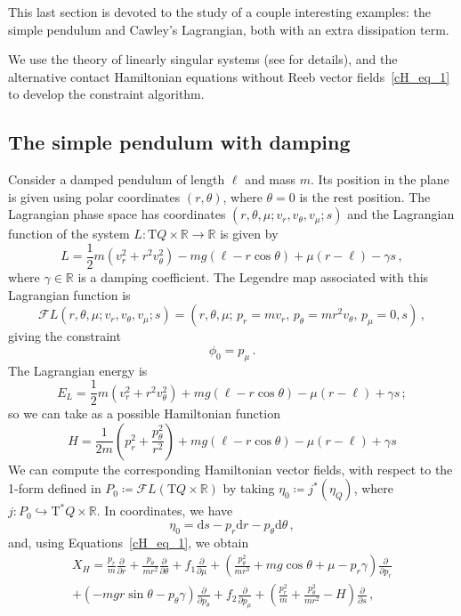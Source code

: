 \documentclass[11pt]{article}
\theoremstyle{plain}
\theoremstyle{definition}
\newcommand{\R}{\mathbb{R}}
\renewcommand{\d}{\mathrm{d}}
\newcommand{\T}{{\mathrm T}}
\let\Tan\T
\newcommand{\F}{\mathcal{F}}
\newcommand{\parder}[2]{\frac{\partial #1}{\partial #2}}
\def\d{\mathrm{d}}
\def\d{\mathrm{d}}
\def\Tan{\mathrm{T}}
\def\FL{\mathcal{F} L}
\begin{document}
This last section is devoted to the study of a couple interesting examples: the simple pendulum and Cawley's Lagrangian, both with an extra dissipation term.

We use the theory of linearly singular systems (see \cite{GP_92} for details), and the alternative contact Hamiltonian equations without Reeb vector fields~\eqref{cH_eq_1} to develop the constraint algorithm.

\subsection{The simple pendulum with damping}

Consider a damped pendulum of length $\ell$ and mass $m$. Its position in the plane is given using polar coordinates $(r,\theta)$, where $\theta = 0$ is the rest position. The Lagrangian phase space has coordinates $(r,\theta,\mu; v_r,v_\theta,v_\mu;s)$ and the Lagrangian function of the system $L\colon\T Q\times\R\to\R$ is given by
$$ L = \frac{1}{2}m(v_r^2 + r^2v_\theta^2) - mg(\ell - r\cos\theta) + \mu(r - \ell) - \gamma s\,, $$
where $\gamma\in\R$ is a damping coefficient. 
The Legendre map associated with this Lagrangian function is
$$ \F L(r,\theta,\mu; v_r,v_\theta,v_\mu;s) = \left( r,\theta,\mu;\, p_r = mv_r,\, p_\theta = mr^2v_\theta,\, p_\mu = 0, s \right)\,, $$
giving the constraint
$$ \phi_0 = p_\mu\,. $$
The Lagrangian energy is
\begin{equation}
    E_L=\frac{1}{2}m(v_r^2 + r^2v_\theta^2) + mg(\ell - r\cos\theta) - \mu(r - \ell) + \gamma s \, ;
\end{equation}
so we can take as a possible Hamiltonian function
\begin{equation}
    H= \frac{1}{2m}\left(p_r^2 + \frac{p_\theta^2}{r^2}\right) + mg(\ell - r\cos\theta) - \mu(r - \ell) + \gamma s
\end{equation}
We can compute the corresponding Hamiltonian vector fields, with respect to the 1-form defined in $P_0\coloneq\FL(\Tan Q \times \R)$ by taking $\eta_0 \coloneqq j^*(\eta_Q)$, where $j\colon P_0\hookrightarrow \Tan^*Q \times \R$. In coordinates, we have
$$
\eta_0 = \d s - p_r \d r -p_{\theta}\d \theta\,,
$$
and, using Equations~\eqref{cH_eq_1}, we obtain
\begin{multline}
    X_H = \frac{p_r}{m}\parder{}{r}+\frac{p_{\theta}}{mr^2}\parder{}{\theta}+f_1\parder{}{\mu} +\left(\frac{p_{\theta}^2}{mr^3}+mg\cos\theta + \mu -p_r\gamma\right)\parder{}{p_r}  \\+(-mgr\sin\theta -p_{\theta}\gamma)\parder{}{p_\theta}+f_2\parder{}{p_{\mu}}+ \left(\frac{p_r^2}{m}+ \frac{p_\theta^2}{mr^2}-H \right)\parder{}{s}\,,
\end{multline}
\end{document}
